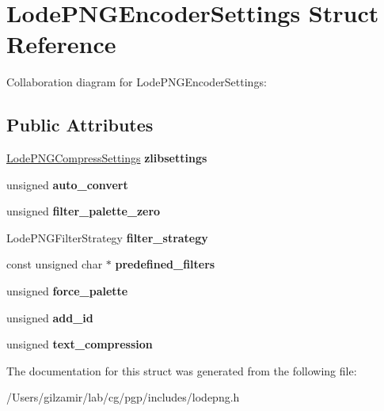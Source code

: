 \hypertarget{struct_lode_p_n_g_encoder_settings}{}\section{Lode\+P\+N\+G\+Encoder\+Settings Struct Reference}
\label{struct_lode_p_n_g_encoder_settings}


Collaboration diagram for Lode\+P\+N\+G\+Encoder\+Settings\+:
\subsection*{Public Attributes}
\begin{DoxyCompactItemize}
\item 
\mbox{\label{struct_lode_p_n_g_encoder_settings_a2c5928b4172c75e27de467870f2ff946}} 
\mbox{\hyperlink{struct_lode_p_n_g_compress_settings}{Lode\+P\+N\+G\+Compress\+Settings}} {\bfseries zlibsettings}
\item 
\mbox{\label{struct_lode_p_n_g_encoder_settings_a1203b8db6532c9ff4a5c8ee692cd327a}} 
unsigned {\bfseries auto\+\_\+convert}
\item 
\mbox{\label{struct_lode_p_n_g_encoder_settings_a0d82e8f2fabcb6cebbc54b80922945f1}} 
unsigned {\bfseries filter\+\_\+palette\+\_\+zero}
\item 
\mbox{\label{struct_lode_p_n_g_encoder_settings_a5e18e4eb941763a2e3e6c65ee9f0729c}} 
Lode\+P\+N\+G\+Filter\+Strategy {\bfseries filter\+\_\+strategy}
\item 
\mbox{\label{struct_lode_p_n_g_encoder_settings_a4446f87b5283f25664802a1be037e76e}} 
const unsigned char $\ast$ {\bfseries predefined\+\_\+filters}
\item 
\mbox{\label{struct_lode_p_n_g_encoder_settings_a04dc9622ccd1d7c74c56291409aa512a}} 
unsigned {\bfseries force\+\_\+palette}
\item 
\mbox{\label{struct_lode_p_n_g_encoder_settings_a893aa542aa7c122c32ee36dd716fbcb2}} 
unsigned {\bfseries add\+\_\+id}
\item 
\mbox{\label{struct_lode_p_n_g_encoder_settings_a6ffdcb8e85a65ea208fe027be072d710}} 
unsigned {\bfseries text\+\_\+compression}
\end{DoxyCompactItemize}


The documentation for this struct was generated from the following file\+:\begin{DoxyCompactItemize}
\item 
/\+Users/gilzamir/lab/cg/pgp/includes/lodepng.\+h\end{DoxyCompactItemize}
